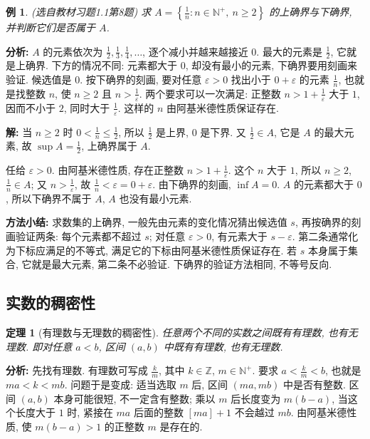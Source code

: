 \documentclass[UTF8,openany]{ctexbook}
\theoremstyle{chinesetextbook}
\newtheorem{example}{例}[section]
\newtheorem{theorem}{定理}[section]
\newenvironment{cnsolution}{\par\indent\textbf{解:} \ignorespaces}{\par}
\begin{document}
\begin{example}
\textnormal{(选自教材习题1.1第8题)} 求 $\displaystyle A=\left\{\frac1n:n\in\mathbb N^+,\ n\ge2\right\}$ 的上确界与下确界, 并判断它们是否属于 $A$.
\end{example}
\par\indent\textbf{分析:} $A$ 的元素依次为 $\displaystyle\frac12,\frac13,\frac14,\ldots$, 逐个减小并越来越接近 $0$. 最大的元素是 $\displaystyle\frac12$, 它就是上确界. 下方的情况不同: 元素都大于 $0$, 却没有最小的元素, 下确界要用刻画来验证. 候选值是 $0$. 按下确界的刻画, 要对任意 $\varepsilon>0$ 找出小于 $0+\varepsilon$ 的元素 $\displaystyle\frac1n$, 也就是找整数 $n$, 使 $n\ge2$ 且 $\displaystyle n>\frac1\varepsilon$. 两个要求可以一次满足: 正整数 $\displaystyle n>1+\frac1\varepsilon$ 大于 $1$, 因而不小于 $2$, 同时大于 $\displaystyle\frac1\varepsilon$. 这样的 $n$ 由阿基米德性质保证存在.
\begin{cnsolution}
当 $n\ge2$ 时 $\displaystyle0<\frac1n\le\frac12$, 所以 $\displaystyle\frac12$ 是上界, $0$ 是下界. 又 $\displaystyle\frac12\in A$, 它是 $A$ 的最大元素, 故 $\displaystyle\sup A=\frac12$, 上确界属于 $A$.

任给 $\varepsilon>0$. 由阿基米德性质, 存在正整数 $\displaystyle n>1+\frac1\varepsilon$. 这个 $n$ 大于 $1$, 所以 $n\ge2$, $\displaystyle\frac1n\in A$; 又 $\displaystyle n>\frac1\varepsilon$, 故 $\displaystyle\frac1n<\varepsilon=0+\varepsilon$. 由下确界的刻画, $\inf A=0$. $A$ 的元素都大于 $0$, 所以下确界不属于 $A$, $A$ 也没有最小元素.
\end{cnsolution}
\par\indent\textbf{方法小结:} 求数集的上确界, 一般先由元素的变化情况猜出候选值 $s$, 再按确界的刻画验证两条: 每个元素都不超过 $s$; 对任意 $\varepsilon>0$, 有元素大于 $s-\varepsilon$. 第二条通常化为下标应满足的不等式, 满足它的下标由阿基米德性质保证存在. 若 $s$ 本身属于集合, 它就是最大元素, 第二条不必验证. 下确界的验证方法相同, 不等号反向.
\subsection{实数的稠密性}
\begin{theorem}[有理数与无理数的稠密性]
任意两个不同的实数之间既有有理数, 也有无理数. 即对任意 $a<b$, 区间 $(a,b)$ 中既有有理数, 也有无理数.
\end{theorem}
\par\indent\textbf{分析:} 先找有理数. 有理数可写成 $\displaystyle\frac km$, 其中 $k\in\mathbb Z$, $m\in\mathbb N^+$. 要求 $\displaystyle a<\frac km<b$, 也就是 $ma<k<mb$. 问题于是变成: 适当选取 $m$ 后, 区间 $(ma,mb)$ 中是否有整数. 区间 $(a,b)$ 本身可能很短, 不一定含有整数; 乘以 $m$ 后长度变为 $m(b-a)$, 当这个长度大于 $1$ 时, 紧接在 $ma$ 后面的整数 $[ma]+1$ 不会越过 $mb$. 由阿基米德性质, 使 $m(b-a)>1$ 的正整数 $m$ 是存在的.
\end{document}
